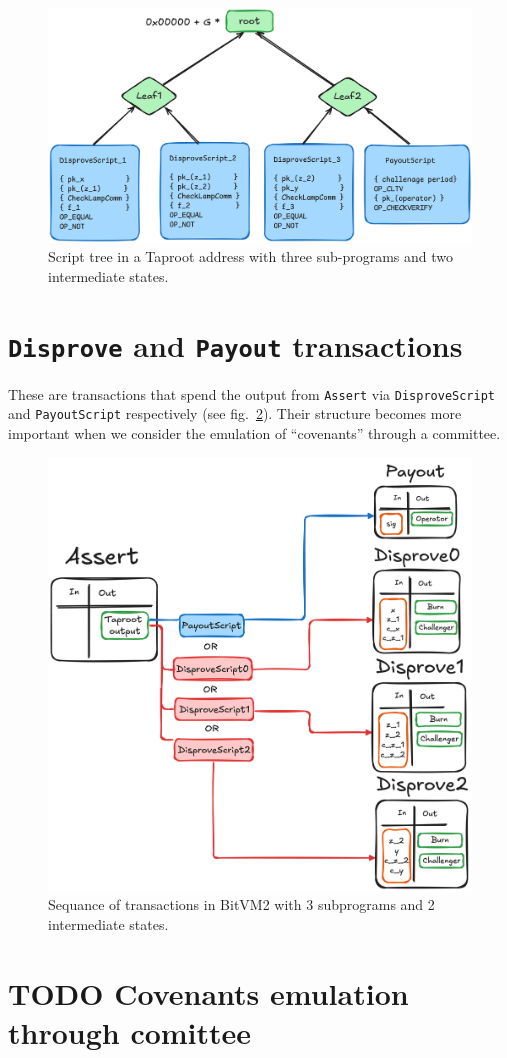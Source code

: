 \documentclass{iacrtrans}
\begin{document}
\begin{figure}[htbp]
  \centering
  \includegraphics[width=.9\linewidth]{../images/assert-tx-taproot-output.png}
  \caption{\label{fig:assert-tx-mast-tree}Script tree in a Taproot
  address with three sub-programs and two intermediate states.}
\end{figure}

\section{\texttt{Disprove} and \texttt{Payout}
transactions}\label{sec:disprove-payout-txs}

These are transactions that spend the output from \texttt{Assert} via
\texttt{DisproveScript} and \texttt{PayoutScript} respectively (see
fig.~\ref{fig:bitvm-txs}). Their structure becomes more important when
we consider the emulation of ``covenants'' through a committee.

\begin{figure}[htbp]
  \centering
  \includegraphics[width=.9\linewidth]{../images/bitvm-txs.png}
  \caption{\label{fig:bitvm-txs}Sequance of transactions in BitVM2
  with 3 subprograms and 2 intermediate states.}
\end{figure}

\section{{\bfseries\sffamily TODO} Covenants emulation through
comittee}\label{sec:covenants-emulation}

\printbibliography{}
\end{document}
